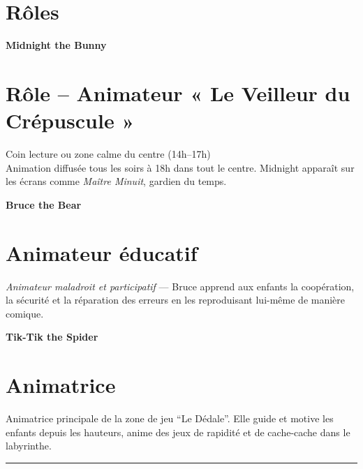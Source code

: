 \section{Rôles} %


\large\textbf{Midnight the Bunny} \\
\section*{Rôle – Animateur « Le Veilleur du Crépuscule »}
Coin lecture ou zone calme du centre (14h–17h)\\
Animation diffusée tous les soirs à 18h dans tout le centre. Midnight apparaît sur les écrans comme \textit{Maître Minuit}, gardien du temps.

\large \textbf{Bruce the Bear} \\
\section*{Animateur éducatif}
\textit{Animateur maladroit et participatif} — Bruce apprend aux enfants la coopération, la sécurité et la réparation des erreurs en les reproduisant lui-même de manière comique.


\large \textbf{Tik-Tik the Spider} \\
\section*{Animatrice}
Animatrice principale de la zone de jeu “Le Dédale”. Elle guide et motive les enfants depuis les hauteurs, anime des jeux de rapidité et de cache-cache dans le labyrinthe.

\vfill
\hrule
